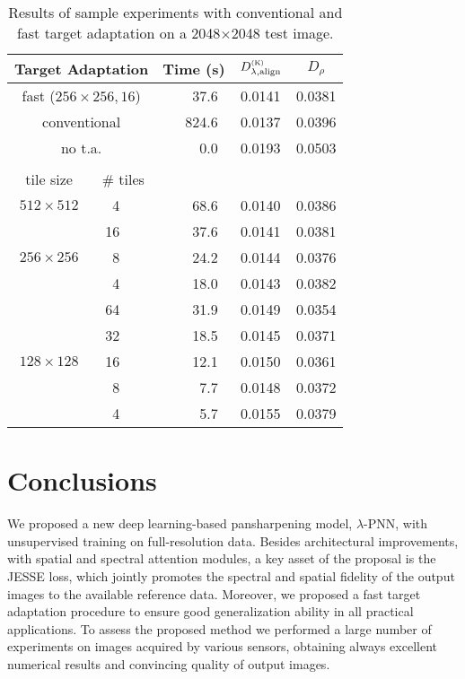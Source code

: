 \documentclass[journal]{IEEEtran}
\newcommand{\ru} {\rule{0mm}{3mm}}
\newcommand{\DLa}{D^{_{\rm (K)}}_{\lambda, \rm align}}
\newcommand{\DR} {D_{\rho}}
\newcommand{\LPNN}  {$\lambda$-PNN}
\begin{document}
{\renewcommand{\ru}{\rule{0mm}{2.8mm}}
\begin{table}
\centering
\setlength{\tabcolsep}{6pt}
\begin{tabular}{cc|r|cc}
\multicolumn{2}{c|}{Target Adaptation}         &   \ru Time (s) &   $\DLa$   &    $\DR$   \\ \hline
\multicolumn{2}{c|}{fast ($256\times256, 16$)} &   \ru  37.6~   &   0.0141   &   0.0381   \\ \hline
\multicolumn{2}{c|}{conventional}              &   \ru 824.6~   &   0.0137   &   0.0396   \\ \hline
\multicolumn{2}{c|}{no t.a.}                   &   \ru   0.0~   &   0.0193   &   0.0503   \\ \hline \\
tile size                     & $\#$ tiles     &                &            &            \\ \hline
 $512\times512$               &  4~~           &   \ru  68.6~   &   0.0140   &   0.0386   \\ \hline
                              & 16~~~          &   \ru  37.6~   &   0.0141   &   0.0381   \\
 $256\times256$               &  8~~           &   \ru  24.2~   &   0.0144   &   0.0376   \\
                              &  4~~           &   \ru  18.0~   &   0.0143   &   0.0382   \\ \hline
                              & 64~~~          &   \ru  31.9~   &   0.0149   &   0.0354   \\
                              & 32~~~          &   \ru  18.5~   &   0.0145   &   0.0371   \\
 $128\times128$               & 16~~~          &   \ru  12.1~   &   0.0150   &   0.0361   \\
                              &  8~~           &   \ru   7.7~   &   0.0148   &   0.0372   \\
                              &  4~~           &   \ru   5.7~   &   0.0155   &   0.0379   \\ \hline
\hline
\end{tabular}
\caption{Results of sample experiments with conventional and fast target adaptation on a 2048$\times$2048 test image.}
\label{tab:fast_ta_metrics}
\end{table}
}


\section{Conclusions}
We proposed a new deep learning-based pansharpening model, \LPNN, with unsupervised training on full-resolution data.
Besides architectural improvements, with spatial and spectral attention modules,
a key asset of the proposal is the JESSE loss, which jointly promotes the spectral and spatial fidelity of the output images to the available reference data.
Moreover, we proposed a fast target adaptation procedure to ensure good generalization ability in all practical applications.
To assess the proposed method we performed a large number of experiments on images acquired by various sensors,
obtaining always excellent numerical results and convincing quality of output images.
\end{document}
